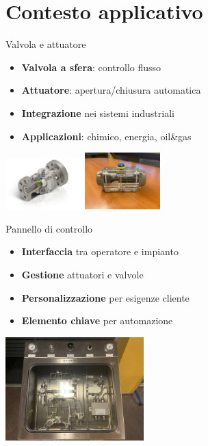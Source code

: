 \documentclass{beamer}
\begin{document}
\section{Contesto applicativo}
\begin{frame}{Valvola e attuatore}
    \begin{itemize}
        \item \textbf{Valvola a sfera}: controllo flusso
        \item \textbf{Attuatore}: apertura/chiusura automatica
        \item \textbf{Integrazione} nei sistemi industriali
        \item \textbf{Applicazioni}: chimico, energia, oil\&gas
    \end{itemize}
    \includegraphics[width=0.22\textwidth]{images/Contesto_Applicativo/valvola_sfera.png} %
    \hspace{0.5cm}
    \includegraphics[width=0.22\textwidth]{images/Contesto_Applicativo/attuatore.jpg} %
\end{frame}

\begin{frame}{Pannello di controllo}
    \begin{itemize}
        \item \textbf{Interfaccia} tra operatore e impianto
        \item \textbf{Gestione} attuatori e valvole
        \item \textbf{Personalizzazione} per esigenze cliente
        \item \textbf{Elemento chiave} per automazione
    \end{itemize}
    \includegraphics[width=0.4\textwidth]{images/Contesto_Applicativo/pannello_controllo.jpg} %
\end{frame}
\end{document}
